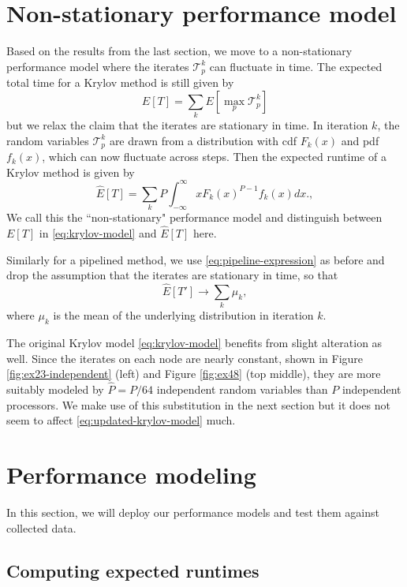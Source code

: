 \documentclass[num-refs]{wiley-article}
\begin{document}
\section{Non-stationary performance model} \label{sec:updated-model}

Based on the results from the last section, we move to a non-stationary performance model where the iterates $\mathcal{T}^k_p$ can fluctuate in time.
The expected total time for a Krylov method is still given by 
$$E[T] = \sum_k E[ \max_p \mathcal{T}^k_p]$$
but we relax the claim that the iterates are stationary in time. In iteration $k$, the random variables $\mathcal{T}^k_p$ are drawn from a distribution with cdf $F_k(x)$ and pdf $f_k(x)$, which can now fluctuate across steps.
Then the expected runtime of a Krylov method is given by 
\begin{equation}
\widehat{E}[T] =  \sum_k P \int ^{\infty}_{-\infty} x F_k(x)^{P-1} f_k(x) dx. \label{eq:updated-krylov-model},
\end{equation}
We call this the ``non-stationary" performance model and distinguish between $E[T]$ in \eqref{eq:krylov-model} and $\widehat{E}[T]$ here.


Similarly for a pipelined method, we use \eqref{eq:pipeline-expression} as before and drop the assumption that the iterates are stationary in time, so that
\begin{equation}
\widehat{E}[T'] \rightarrow  \sum_k \mu_k \label{eq:updated-pipelined-model},
\end{equation}
where $\mu_k$ is the mean of the underlying distribution in iteration $k$. 

The original Krylov model \eqref{eq:krylov-model} benefits from slight alteration as well. 
Since the iterates on each node are nearly constant, shown in Figure \eqref{fig:ex23-independent} (left) and Figure \ref{fig:ex48} (top middle), they are more suitably modeled by $\widehat{P} = P/64$  independent random variables than $P$ independent processors. We make use of this substitution in the next section but it does not seem to affect \eqref{eq:updated-krylov-model} much.


\section{Performance modeling} \label{sec:performance-model}

In this section, we will deploy our performance models and test them against collected data.

\subsection{Computing expected runtimes} \label{sec:computing-runtimes}
\end{document}
